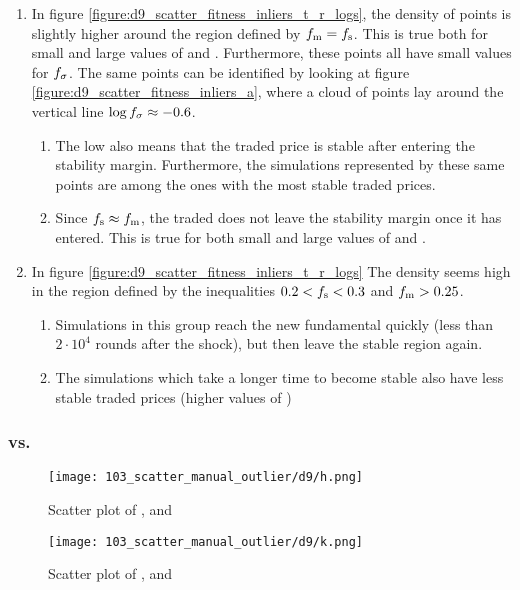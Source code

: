 \begin{enumerate}
\item In figure \ref{figure:d9_scatter_fitness_inliers_t_r_logs}, the density of points is slightly higher around the region defined by $f_\text{m} = f_\text{s}$. This is true both for small and large values of \timetoreachnewfundamental and \roundstable. Furthermore, these points all have small values for $f_\sigma$. The same points can be identified by looking at figure \ref{figure:d9_scatter_fitness_inliers_a}, where a cloud of points lay around the vertical line $\log f_\sigma \approx -0.6$.
\begin{enumerate}
	\item The low \stdev also means that the traded price is stable after entering the stability margin. Furthermore, the simulations represented by these same points are among the ones with the most stable traded prices.
	\item Since $f_\text{s} \approx f_\text{m}$, the traded does not leave the stability margin once it has entered. This is true for both small and large values of \timetoreachnewfundamental and \roundstable.
\end{enumerate}
\item In figure \ref{figure:d9_scatter_fitness_inliers_t_r_logs} The density seems high in the region defined by the inequalities $0.2 < f_\text{s} < 0.3$ and $f_\text{m} > 0.25$. 
	\begin{enumerate}
	\item Simulations in this group reach the new fundamental quickly (less than $2\cdot 10^4$ rounds after the shock), but then leave the stable region again.
	\item The simulations which take a longer time to become stable also have less stable traded prices (higher values of \stdev)
	\end{enumerate}
\end{enumerate}



\subsubsection{\stdev vs. \timetoreachnewfundamental}
\begin{figure}
\centering
\texttt{[image: 103\_scatter\_manual\_outlier/d9/h.png]}
\caption{Scatter plot of \roundstable, \timetoreachnewfundamental and \stdev}
\label{figure:d9_scatter_fitness_inliers_logs_t_r}
\end{figure}
\begin{figure}
\centering
\texttt{[image: 103\_scatter\_manual\_outlier/d9/k.png]}
\caption{Scatter plot of \roundstable, \timetoreachnewfundamental and \overshoot}
\label{figure:d9_scatter_fitness_inliers_logs_t_o}
\end{figure}

